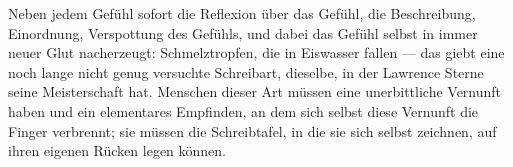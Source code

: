 Neben jedem Gefühl sofort die Reflexion über das Gefühl, die Beschreibung, Einordnung, Verspottung des Gefühls, und dabei das Gefühl selbst in immer neuer Glut nacherzeugt: Schmelztropfen, die in Eiswasser fallen — das giebt eine noch lange nicht genug versuchte Schreibart, dieselbe, in der Lawrence Sterne seine Meisterschaft hat. Menschen dieser Art müssen eine unerbittliche Vernunft haben und ein elementares Empfinden, an dem sich selbst diese Vernunft die Finger verbrennt; sie müssen die Schreibtafel, in die sie sich selbst zeichnen, auf ihren eigenen Rücken legen können.
\par

